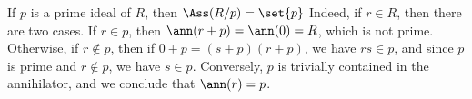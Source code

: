 If $p$ is a prime ideal of $R$, then $\Ass(R/p) = \set{p}$ Indeed, if $r \in R$,
then there are two cases. If $r \in p$, then $\ann(r + p) = \ann(0) = R$, which is not
prime. Otherwise, if $r\notin p$, then if $0 + p = (s + p)(r + p)$, we have
$rs \in p$, and since $p$ is prime and $r \notin p$, we have $s \in p$. Conversely,
$p$ is trivially contained in the annihilator, and we conclude that
$\ann(r) = p$.
